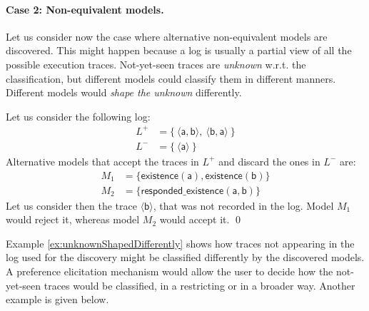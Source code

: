 \paragraph{Case 2: Non-equivalent models.}
Let us consider now the case where alternative non-equivalent models are discovered.
This might happen because a log is usually a partial view of all the possible execution traces. Not-yet-seen traces are \emph{unknown} w.r.t. the classification, but different models could classify them in different manners. Different models would \emph{shape the unknown} differently.

\begin{example}
\label{ex:unknownShapedDifferently}
Let us consider the following log:
\begin{align*}
L^+ & = \{\ \langle \mathsf{a}, \mathsf{b} \rangle,\ \langle \mathsf{b}, \mathsf{a} \rangle \ \} \\
L^- & = \{\ \langle \mathsf{a} \rangle \ \}
\end{align*}
%
Alternative models that accept the traces in $L^+$ and discard the ones in $L^-$ are:
\begin{align*}
M_1 & = \{ \mathsf{existence(a),existence(b)}\} \\
M_2 & = \{ \mathsf{responded\_existence(a, b)}\}
\end{align*}
%
Let us consider then the trace $\langle \mathsf{b} \rangle$, that was not recorded in the log. Model $M_1$ %
would reject it, whereas model $M_2$ %
would accept it.
\qed
\end{example}

Example \ref{ex:unknownShapedDifferently} shows how traces not appearing in the log used for the discovery might be classified differently by the discovered models. A preference elicitation mechanism would allow the  user to decide how the not-yet-seen traces would be classified, in a restricting or in a broader way. Another example is given below.


